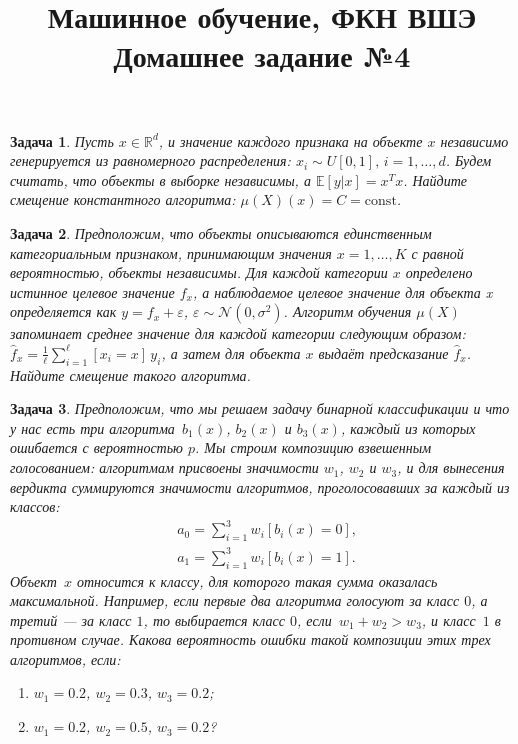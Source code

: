 \documentclass[12pt,fleqn]{article}
\title{Машинное обучение, ФКН ВШЭ\\Домашнее задание №4}
\author{}
\date{}
\newtheorem{esProblem}{Задача}
\begin{document}
    \maketitle
    
    \begin{esProblem}
        Пусть $x \in \mathbb{R}^d$, и значение каждого признака на объекте $x$ независимо генерируется из равномерного распределения: $x_i \sim U[0, 1], \, i = 1, \dots, d$. Будем считать, что объекты в выборке независимы, а $\mathbb{E}[y|x] = x^T x$. Найдите смещение константного алгоритма: $\mu(X)(x) = C = \text{const}$.    
        
    \end{esProblem}
    
    \begin{esProblem}
        Предположим, что объекты описываются единственным категориальным признаком, принимающим значения $x = 1, \dots, K$ с равной вероятностью, объекты независимы. Для каждой категории $x$ определено истинное целевое значение $f_x$, а наблюдаемое целевое значение для объекта x определяется как $y = f_x + \varepsilon$, $\varepsilon \sim \mathcal{N}(0, \sigma^2)$. Алгоритм обучения $\mu(X)$ запоминает среднее значение для каждой категории следующим образом: $\hat f_x = \frac 1 \ell \sum_{i=1}^\ell [x_i=x] \, y_i$, а затем для объекта $x$ выдаёт предсказание $\hat f_x$. Найдите смещение такого алгоритма.
        
    \end{esProblem}
    
    \begin{esProblem}
        Предположим, что мы решаем задачу бинарной классификации и что у нас есть три алгоритма~$b_1(x)$, $b_2(x)$ и $b_3(x)$,
        каждый из которых ошибается с вероятностью $p$.
        Мы строим композицию взвешенным голосованием: алгоритмам присвоены значимости $w_1$, $w_2$ и $w_3$,
        и для вынесения вердикта суммируются значимости алгоритмов, проголосовавших за каждый из классов:
        \begin{align*}
            &a_0 = \sum_{i = 1}^{3} w_i [b_i(x) = 0],\\
            &a_1 = \sum_{i = 1}^{3} w_i [b_i(x) = 1].
        \end{align*}
        Объект~$x$ относится к классу, для которого такая сумма оказалась максимальной.
        Например, если первые два алгоритма голосуют за класс $0$,
        а третий --- за класс $1$, то выбирается класс $0$, если~$w_1 + w_2 > w_3$, и класс~$1$ в противном случае.
        Какова вероятность ошибки такой композиции этих трех алгоритмов, если:
        \begin{enumerate}
            \item $w_1 = 0.2$, $w_2 = 0.3$, $w_3 = 0.2$;
            \item $w_1 = 0.2$, $w_2 = 0.5$, $w_3 = 0.2$?
        \end{enumerate}

    \end{esProblem}
\end{document}
